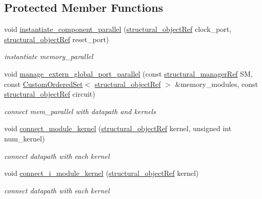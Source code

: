 \subsection*{Protected Member Functions}
\begin{DoxyCompactItemize}
\item 
void \hyperlink{classdatapath__parallel__cs_af732dc543f89fa502e853c2abeac2ef8}{instantiate\+\_\+component\+\_\+parallel} (\hyperlink{structural__objects_8hpp_a8ea5f8cc50ab8f4c31e2751074ff60b2}{structural\+\_\+object\+Ref} clock\+\_\+port, \hyperlink{structural__objects_8hpp_a8ea5f8cc50ab8f4c31e2751074ff60b2}{structural\+\_\+object\+Ref} reset\+\_\+port)
\begin{DoxyCompactList}\small\item\em instantiate memory\+\_\+parallel \end{DoxyCompactList}\item 
void \hyperlink{classdatapath__parallel__cs_aa24cfc8f823ccba9194eed8aa4bfac32}{manage\+\_\+extern\+\_\+global\+\_\+port\+\_\+parallel} (const \hyperlink{structural__manager_8hpp_ab3136f0e785d8535f8d252a7b53db5b5}{structural\+\_\+manager\+Ref} SM, const \hyperlink{classCustomOrderedSet}{Custom\+Ordered\+Set}$<$ \hyperlink{structural__objects_8hpp_a8ea5f8cc50ab8f4c31e2751074ff60b2}{structural\+\_\+object\+Ref} $>$ \&memory\+\_\+modules, const \hyperlink{structural__objects_8hpp_a8ea5f8cc50ab8f4c31e2751074ff60b2}{structural\+\_\+object\+Ref} circuit)
\begin{DoxyCompactList}\small\item\em connect mem\+\_\+parallel with datapath and kernels \end{DoxyCompactList}\item 
void \hyperlink{classdatapath__parallel__cs_a641a653a7ee22f066b3c6f592af2669f}{connect\+\_\+module\+\_\+kernel} (\hyperlink{structural__objects_8hpp_a8ea5f8cc50ab8f4c31e2751074ff60b2}{structural\+\_\+object\+Ref} kernel, unsigned int num\+\_\+kernel)
\begin{DoxyCompactList}\small\item\em connect datapath with each kernel \end{DoxyCompactList}\item 
void \hyperlink{classdatapath__parallel__cs_a13170eb5321f0a469bad1b7db4c1cd9a}{connect\+\_\+i\+\_\+module\+\_\+kernel} (\hyperlink{structural__objects_8hpp_a8ea5f8cc50ab8f4c31e2751074ff60b2}{structural\+\_\+object\+Ref} kernel)
\begin{DoxyCompactList}\small\item\em connect datapath with each kernel \end{DoxyCompactList}\item 

\end{DoxyCompactItemize}
